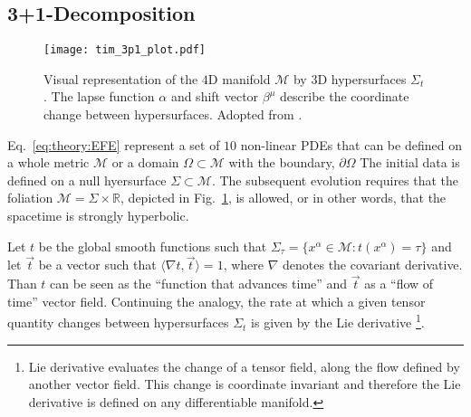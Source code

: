 \subsection{3+1-Decomposition}

\begin{figure}[t]
    \centering 
    \texttt{[image: tim\_3p1\_plot.pdf]}
    \caption{
        Visual representation of the $4$D manifold $\mathcal{M}$ by $3$D hypersurfaces 
        $\Sigma_t$. The lapse function $\alpha$ and shift vector $\beta^{\mu}$ describe the 
        coordinate change between hypersurfaces.
        Adopted from \citet{Dietrich:2016phd}.
    }
    \label{fig:theory:3p1}
\end{figure}

Eq.~\eqref{eq:theory:EFE} represent a set of $10$ non-linear \acp{PDE} 
that can be defined on a whole metric $\mathcal{M}$ or a domain $\Omega\subset\mathcal{M}$ 
with the boundary, $\partial\Omega$%
%
The initial data is defined on a null hyersurface $\Sigma\subset\mathcal{M}$. 
The subsequent evolution requires that the foliation 
$\mathcal{M}=\Sigma\times\mathbb{R}$, depicted in Fig.~\ref{fig:theory:3p1}, 
is allowed, or in other words, that the spacetime is strongly hyperbolic. 
%


Let $t$ be the global smooth functions such that 
$\Sigma_{\tau} = \{x^{\alpha}\in\mathcal{M}: t(x^{\alpha})=\tau\}$ 
and let $\vec{t}$ be a vector such that $\langle\nabla t, \vec{t}\rangle = 1$,
where $\nabla$ denotes the covariant derivative.
%
Than $t$ can be seen as the ``function that advances time'' and $\vec{t}$ as a 
``flow of time'' vector field. 
Continuing the analogy, the rate at which a given tensor quantity changes 
between hypersurfaces $\Sigma_t$ is given by the Lie derivative
\footnote{
    Lie derivative evaluates the change of a tensor field, along the flow 
    defined by another vector field. This change is coordinate invariant 
    and therefore the Lie derivative is defined on any differentiable manifold.
}.%

